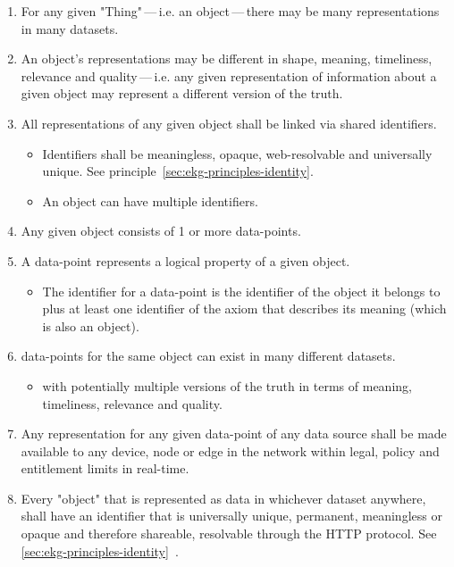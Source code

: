 \begin{enumerate}
    \item For any given "Thing"\,---\,i.e. an object\,---\,there may be many representations in many datasets.
    \item An object's representations may be different in shape, meaning, timeliness, relevance and quality\,---\,i.e.
          any given representation of information about a given object may represent a different version of the truth.
    \item All representations of any given object shall be linked via shared identifiers.
          \begin{itemize}
              \item Identifiers shall be meaningless, opaque, web-resolvable and universally unique.
                    See principle~\ref{sec:ekg-principles-identity}.
              \item An object can have multiple identifiers.
          \end{itemize}
    \item Any given object consists of 1 or more \glspl{data-point}.
    \item A \gls{data-point} represents a logical property of a given object.
          \begin{itemize}
              \item The identifier for a \gls{data-point} is the identifier of the object it belongs to plus at least one
                    identifier of the axiom that describes its meaning (which is also an object).
          \end{itemize}
    \item \glspl{data-point} for the same object can exist in many different datasets.
          \begin{itemize}
              \item with potentially multiple versions of the truth in terms of meaning, timeliness,
                    relevance and quality.
          \end{itemize}
    \item Any representation for any given \gls{data-point} of any data source shall be made available to any device,
          node or edge in the network within legal, policy and entitlement limits in real-time.
    \item Every "object" that is represented as data in whichever dataset anywhere, shall have an identifier
          that is universally unique, permanent, meaningless or opaque and therefore shareable,
          resolvable through the HTTP protocol.
          See \ref{sec:ekg-principles-identity}~.
\end{enumerate}

